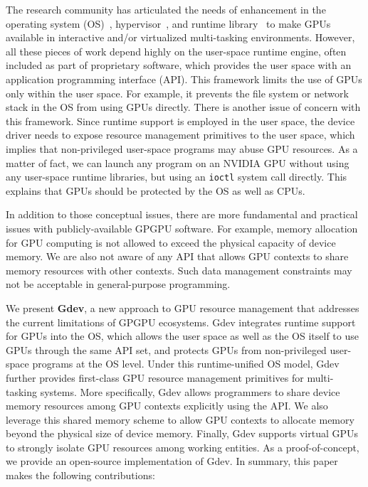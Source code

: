 The research community has articulated the needs of enhancement in 
the operating system (OS)~\cite{Bautin_MCNC08, Kato_ATC11,
Rossbach_SOSP11}, hypervisor~\cite{Gupta_ATC11}, and runtime
library~\cite{Kato_RTSS11} to make GPUs available in interactive
and/or virtualized multi-tasking environments.
However, all these pieces of work depend highly on the user-space runtime
engine, often included as part of proprietary software, which provides
the user space with an application programming interface (API).
This framework limits the use of GPUs only within the user space.
For example, it prevents the file system or network stack in the OS from
using GPUs directly.
There is another issue of concern with this framework.
Since runtime support is employed in the user space, the device
driver needs to expose resource management primitives to the user space,
which implies that non-privileged user-space programs may abuse GPU
resources.
As a matter of fact, we can launch any program on an NVIDIA GPU without
using any user-space runtime libraries, but using an \texttt{ioctl}
system call directly. 
This explains that GPUs should be protected by the OS as well as CPUs.

In addition to those conceptual issues, there are more fundamental and
practical issues with publicly-available GPGPU software.
For example, memory allocation for GPU computing is not allowed to
exceed the physical capacity of device memory.
We are also not aware of any API that allows GPU contexts to share
memory resources with other contexts.
Such data management constraints may not be acceptable in
general-purpose programming.

We present \textbf{Gdev}, a new approach to GPU resource management that
addresses the current limitations of GPGPU ecosystems.
Gdev integrates runtime support for GPUs into the OS, which allows the
user space as well as the OS itself to use GPUs through the same API
set, and protects GPUs from non-privileged user-space programs at the OS
level.
Under this runtime-unified OS model, Gdev further provides first-class GPU
resource management primitives for multi-tasking systems.
More specifically, Gdev allows programmers to share device memory
resources among GPU contexts explicitly using the API. 
We also leverage this shared memory scheme to allow GPU contexts to
allocate memory beyond the physical size of device memory.
Finally, Gdev supports virtual GPUs to strongly isolate GPU resources
among working entities.
As a proof-of-concept, we provide an open-source implementation of Gdev.
In summary, this paper makes the following contributions:

